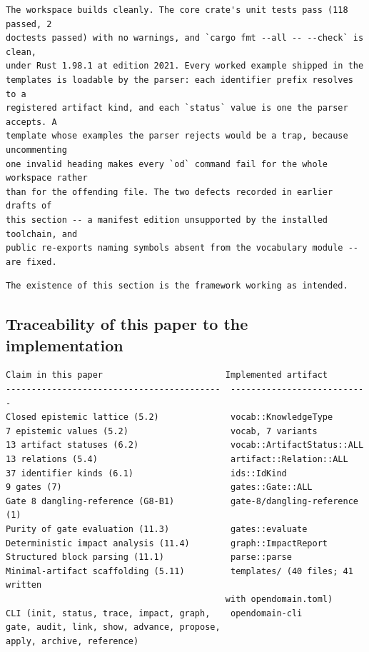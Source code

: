 \documentclass[11pt,a4paper]{article}
\begin{document}
\begin{Verbatim}[fontsize=\footnotesize,breaklines=true,breakanywhere=true,breakautoindent=false,samepage=false]
The workspace builds cleanly. The core crate's unit tests pass (118 passed, 2
doctests passed) with no warnings, and `cargo fmt --all -- --check` is clean,
under Rust 1.98.1 at edition 2021. Every worked example shipped in the
templates is loadable by the parser: each identifier prefix resolves to a
registered artifact kind, and each `status` value is one the parser accepts. A
template whose examples the parser rejects would be a trap, because uncommenting
one invalid heading makes every `od` command fail for the whole workspace rather
than for the offending file. The two defects recorded in earlier drafts of
this section -- a manifest edition unsupported by the installed toolchain, and
public re-exports naming symbols absent from the vocabulary module -- are fixed.
\end{Verbatim}

\begin{Verbatim}[fontsize=\footnotesize,breaklines=true,breakanywhere=true,breakautoindent=false,samepage=false]
The existence of this section is the framework working as intended.
\end{Verbatim}

\subsection{Traceability of this paper to the implementation}

\begin{Verbatim}[fontsize=\footnotesize,breaklines=true,breakanywhere=true,breakautoindent=false,samepage=false]
Claim in this paper                        Implemented artifact
------------------------------------------  ---------------------------
Closed epistemic lattice (5.2)              vocab::KnowledgeType
7 epistemic values (5.2)                    vocab, 7 variants
13 artifact statuses (6.2)                  vocab::ArtifactStatus::ALL
13 relations (5.4)                          artifact::Relation::ALL
37 identifier kinds (6.1)                   ids::IdKind
9 gates (7)                                 gates::Gate::ALL
Gate 8 dangling-reference (G8-B1)           gate-8/dangling-reference (1)
Purity of gate evaluation (11.3)            gates::evaluate
Deterministic impact analysis (11.4)        graph::ImpactReport
Structured block parsing (11.1)             parse::parse
Minimal-artifact scaffolding (5.11)         templates/ (40 files; 41 written
                                           with opendomain.toml)
CLI (init, status, trace, impact, graph,    opendomain-cli
gate, audit, link, show, advance, propose,
apply, archive, reference)
\end{Verbatim}
\end{document}
